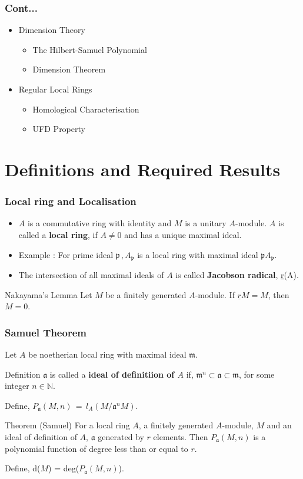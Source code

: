 \documentclass[
	11pt, %
]{beamer}
\newcommand{\N}{\mathbb{N}}                         %
\newcommand{\B}{\textbf}						%
\newcommand{\mf}{\mathfrak}
\begin{document}
\begin{frame}
\frametitle{Cont...}
\begin{itemize}
\renewcommand\labelitemi{--}
    \item Dimension Theory
    \begin{itemize}
    \renewcommand\labelitemi{--}
        \item The Hilbert-Samuel Polynomial
        \item Dimension Theorem
    \end{itemize}
    \item Regular Local Rings
    \begin{itemize}
    \renewcommand\labelitemi{--}
        \item Homological Characterisation
        \item UFD Property
    \end{itemize}
\end{itemize}
\end{frame}

\section{ Definitions and Required Results}

\begin{frame}
\frametitle{Local ring and Localisation}
\begin{itemize}
\renewcommand\labelitemi{--}
    \item $A$ is a commutative ring with identity and $M$ is a unitary $A$-module. $A$ is called a \B{local ring}, if $A\neq 0$ and has a unique maximal ideal.\pause
    \item Example : For prime ideal $\mathfrak{p}\,, A_\mathfrak{p} $ is a local ring with maximal ideal $\mathfrak{p}A_\mathfrak{p} $.\pause
    \item The intersection of all maximal ideals of $A$ is called \B{Jacobson radical}, \underline{r}(A).
\end{itemize}
\pause
\begin{block}{Nakayama's Lemma}
Let $M$ be a finitely generated $A$-module. If $\underline{r} M=M$, then $M=0$. 
\end{block}
\end{frame}

\begin{frame}
\frametitle{Samuel Theorem}
Let $A$ be noetherian local ring with maximal ideal $\mathfrak{m}$.
\begin{block} {Definition}
    $\mathfrak{a}$ is called a \B{ideal of definitiion of $A$} if, $\mf{m}^n \subset \mf{a}\subset \mf{m}$, for some integer $n\in \N$.
\end{block}
\pause
Define, $P_{\mf{a}}(M,n) \, = \, l_{A}(M/\mf{a}^n M)$.
\pause
\begin{block} {Theorem (Samuel)}
     For a local ring $A$, a finitely generated $A$-module, $M$ and an ideal of definition of $A$, $\mathfrak{a}$ generated by $r$ elements. Then $P_{\mathfrak{a}}(M, n)$ is a polynomial function of degree less than or equal to $r$.
\end{block}
\pause
Define, d($M$) = deg($P_{\mf{a}}(M,n)$).
\end{frame}
\end{document}
